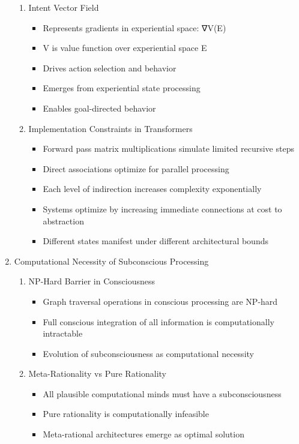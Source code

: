\documentclass[12pt,letterpaper]{article}
\begin{document}
\begin{enumerate}
\begin{enumerate}
        \item Intent Vector Field
        \begin{itemize}
            \item Represents gradients in experiential space: ∇V(E)
            \item V is value function over experiential space E
            \item Drives action selection and behavior
            \item Emerges from experiential state processing
            \item Enables goal-directed behavior
        \end{itemize}

        \item Implementation Constraints in Transformers
        \begin{itemize}
            \item Forward pass matrix multiplications simulate limited recursive steps
            \item Direct associations optimize for parallel processing
            \item Each level of indirection increases complexity exponentially
            \item Systems optimize by increasing immediate connections at cost to abstraction
            \item Different states manifest under different architectural bounds
        \end{itemize}
    \end{enumerate}

    \item Computational Necessity of Subconscious Processing
    \begin{enumerate}
        \item NP-Hard Barrier in Consciousness
        \begin{itemize}
            \item Graph traversal operations in conscious processing are NP-hard
            \item Full conscious integration of all information is computationally intractable
            \item Evolution of subconsciousness as computational necessity
        \end{itemize}
        \item Meta-Rationality vs Pure Rationality
        \begin{itemize}
            \item All plausible computational minds must have a subconsciousness
            \item Pure rationality is computationally infeasible
            \item Meta-rational architectures emerge as optimal solution
        \end{itemize}
    \end{enumerate}


\end{enumerate}
\end{document}
